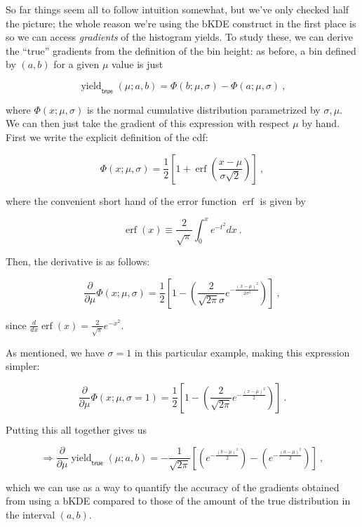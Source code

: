 \documentclass[
  11pt,
  numbers=noendperiod]{book}
\begin{document}
So far things seem all to follow intuition somewhat, but we've only
checked half the picture; the whole reason we're using the bKDE
construct in the first place is so we can access \emph{gradients} of the
histogram yields. To study these, we can derive the ``true'' gradients
from the definition of the bin height: as before, a bin defined by
\((a,b)\) for a given \(\mu\) value is just

\[\operatorname{yield}_{\mathsf{true}}(\mu; a,b) = \Phi(b;\mu, \sigma) - \Phi(a;\mu, \sigma) ~,\]

where \(\Phi(x; \mu, \sigma)\) is the normal cumulative distribution
parametrized by \(\sigma, \mu\). We can then just take the gradient of
this expression with respect \(\mu\) by hand. First we write the
explicit definition of the cdf:

\[\Phi(x; \mu, \sigma) = \frac{1}{2}\left[1+\operatorname{erf}\left(\frac{x-\mu}{\sigma \sqrt{2}}\right)\right]~,\]

where the convenient short hand of the error function
\(\operatorname{erf}\) is given by

\[
\operatorname{erf}(x) \equiv \frac{2}{\sqrt{\pi}} \int_0^x e^{-t^2} d x~.
\]

Then, the derivative is as follows:

\[\frac{\partial}{\partial\mu}\Phi(x;\mu, \sigma) = \frac{1}{2}\left[1-\left(\frac{2}{\sqrt{2\pi}\sigma} e^{-\frac{(x-\mu)^2}{2\sigma^2}}\right)\right]~,\]

since
\(\frac{d}{dx} \operatorname{erf}(x)=\frac{2}{\sqrt{\pi}} e^{-x^{2}}\).

As mentioned, we have \(\sigma=1\) in this particular example, making
this expression simpler:

\[ \frac{\partial}{\partial\mu}\Phi(x;\mu, \sigma=1) = \frac{1}{2}\left[1-\left(\frac{2}{\sqrt{2\pi}} e^{-\frac{(x-\mu)^2}{2}}\right)\right]~.\]

Putting this all together gives us

\[\Rightarrow \frac{\partial}{\partial\mu}\operatorname{yield}_{\mathsf{true}}(\mu; a,b) = -\frac{1}{\sqrt{2\pi}}\left[\left(e^{-\frac{(b-\mu)^2}{2}}\right) - \left( e^{-\frac{(a-\mu)^2}{2}}\right)\right]~,\]

which we can use as a way to quantify the accuracy of the gradients
obtained from using a bKDE compared to those of the amount of the true
distribution in the interval \((a,b)\).
\end{document}
